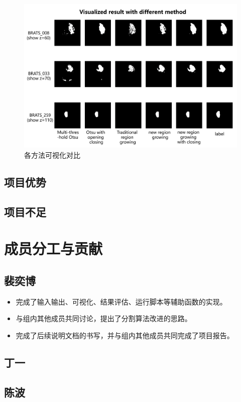 \documentclass[UTF8]{ctexart}
\begin{document}
  \begin{figure}[H]
    \centering  %
    \includegraphics[width=\textwidth]{figure/result.png}
    \caption{各方法可视化对比}
\end{figure}

\subsection{项目优势}
\subsection{项目不足}

\section{成员分工与贡献}
\subsection{裴奕博}
\begin{itemize}
    \item 完成了输入输出、可视化、结果评估、运行脚本等辅助函数的实现。
    \item 与组内其他成员共同讨论，提出了分割算法改进的思路。
    \item 完成了后续说明文档的书写，并与组内其他成员共同完成了项目报告。
\end{itemize}
\subsection{丁一}
\subsection{陈波}
\end{document}

